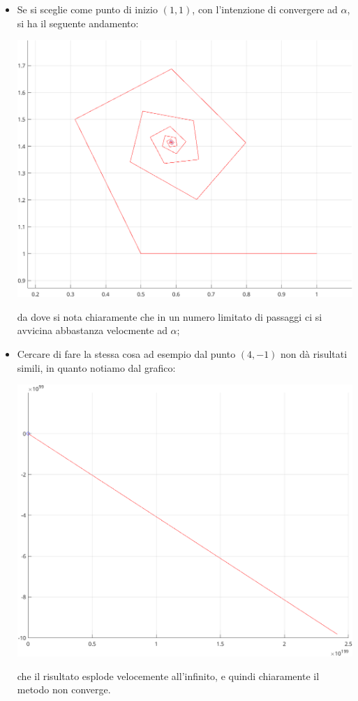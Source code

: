 \documentclass[a4paper,11pt]{article}
\begin{document}
\begin{itemize}
	\item Se si sceglie come punto di inizio $(1, 1)$, con l'intenzione di convergere ad $\alpha$, si ha il seguente andamento:
		\begin{center}
			\includegraphics[scale=1]{../figures/nonlin_ex.png}
		\end{center}
		da dove si nota chiaramente che in un numero limitato di passaggi ci si avvicina abbastanza velocmente ad $\alpha$;
		\newpage
	\item Cercare di fare la stessa cosa ad esempio dal punto $(4, -1)$ non dà risultati simili, in quanto notiamo dal grafico:
		\begin{center}
			\includegraphics[scale=1]{../figures/nonlin_ex2.png}
		\end{center}
		che il risultato esplode velocemente all'infinito, e quindi chiaramente il metodo non converge.
\end{itemize}
\end{document}
